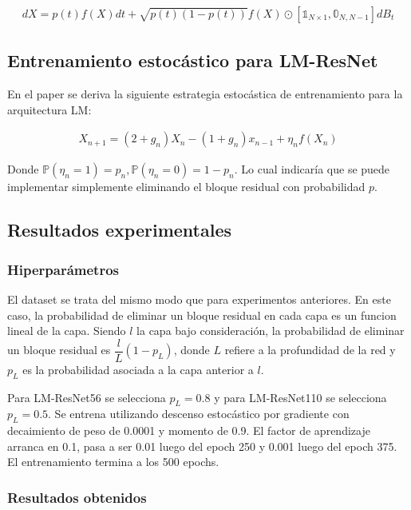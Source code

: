 \documentclass[titlepage,a4paper,oneside]{article}
\begin{document}
\begin{align}
	dX = p(t) f(X) dt + \sqrt{p(t) (1-p(t))} f(X) \odot [\mathbb{1}_{N \times 1}, \mathbb{0}_{N, N - 1}] dB_t
\end{align}

\subsection{Entrenamiento estocástico para LM-ResNet}
En el paper se deriva la siguiente estrategia estocástica de entrenamiento para la arquitectura LM:

\begin{align}
	X_{n+1} = (2 + g_n) X_n - (1 + g_n) x_{n-1} + \eta_n f(X_n)
\end{align}

Donde $\mathbb{P}(\eta_n = 1) = p_n, \mathbb{P}(\eta_n = 0) = 1 - p_n$. Lo cual indicaría que se puede implementar simplemente eliminando el bloque residual con probabilidad $p$.

\subsection{Resultados experimentales}
\subsubsection{Hiperparámetros}
El dataset se trata del mismo modo que para experimentos anteriores. En este caso, la probabilidad de eliminar un bloque residual en cada capa es un funcion lineal de la capa. Siendo $l$ la capa bajo consideración, la probabilidad de eliminar un bloque residual es $\dfrac{l}{L}(1 - p_L)$, donde $L$ refiere a la profundidad de la red y $p_L$ es la probabilidad asociada a la capa anterior a $l$.

Para LM-ResNet56 se selecciona $p_L = 0.8$ y para LM-ResNet110 se selecciona $p_L = 0.5$. Se entrena utilizando descenso estocástico por gradiente con decaimiento de peso de 0.0001 y momento de 0.9. El factor de aprendizaje arranca en 0.1, pasa a ser 0.01 luego del epoch 250 y 0.001 luego del epoch 375. El entrenamiento termina a los 500 epochs.

\subsubsection{Resultados obtenidos}
\end{document}
